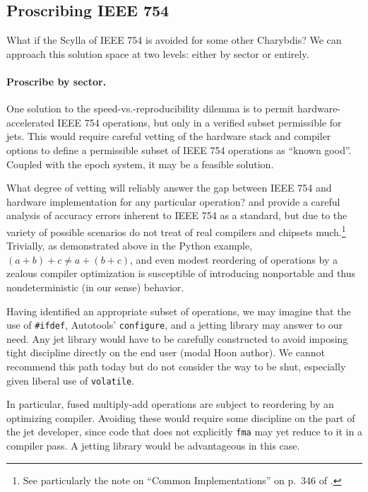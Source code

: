 \documentclass[twoside]{article}
\begin{document}
\subsection{Proscribing IEEE 754}

What if the Scylla of IEEE 754 is avoided for some other Charybdis?  We can approach this solution space at two levels:  either by sector or entirely.

\paragraph{Proscribe by sector.}

One solution to the speed-vs.-reproducibility dilemma is to permit hardware-accelerated IEEE 754 operations, but only in a verified subset permissible for jets.  This would require careful vetting of the hardware stack and compiler options to define a permissible subset of IEEE 754 operations as “known good”.  Coupled with the epoch system, it may be a feasible solution.

What degree of vetting will reliably answer the gap between IEEE 754 and hardware implementation for any particular operation?  \citet[pp.~330ff.]{Jones2008} and \citet{Goldberg1991} provide a careful analysis of accuracy errors inherent to IEEE 754 as a standard, but due to the variety of possible scenarios do not treat of real compilers and chipsets much.\footnote{See particularly the note on “Common Implementations” on p.~346 of \citet{Jones2008}.}  Trivially, as demonstrated above in the Python example, $(a + b) + c \neq a + (b + c)$, and even modest reordering of operations by a zealous compiler optimization is susceptible of introducing nonportable and thus nondeterministic (in our sense) behavior.

Having identified an appropriate subset of operations, we may imagine that the use of \texttt{\#ifdef}, Autotools’ \texttt{configure}, and a jetting library may answer to our need.  Any jet library would have to be carefully constructed to avoid imposing tight discipline directly on the end user (modal Hoon author).  We cannot recommend this path today but do not consider the way to be shut, especially given liberal use of \texttt{volatile}.

In particular, fused multiply-add operations are subject to reordering by an optimizing compiler.  Avoiding these would require some discipline on the part of the jet developer, since code that does not explicitly \texttt{fma} may yet reduce to it in a compiler pass.  A jetting library would be advantageous in this case.
\end{document}
